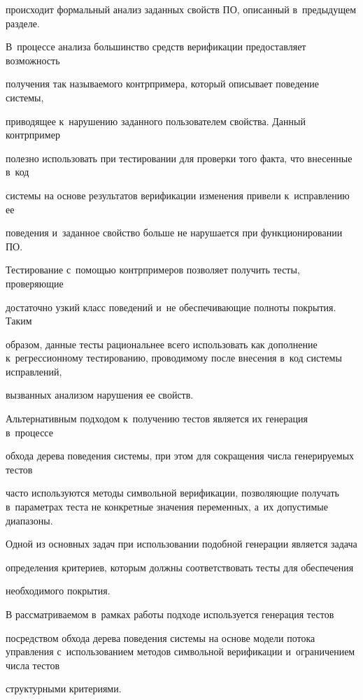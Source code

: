происходит формальный анализ заданных свойств ПО, описанный в~предыдущем разделе.


В~процессе анализа большинство средств верификации предоставляет возможность


получения так называемого контрпримера, который описывает поведение системы,


приводящее к~нарушению заданного пользователем свойства. Данный контрпример


полезно использовать при тестировании для проверки того факта, что внесенные в~код


системы на основе результатов верификации изменения привели к~исправлению ее


поведения и~заданное свойство больше не нарушается при функционировании ПО.


Тестирование с~помощью контрпримеров позволяет получить тесты, про\-ве\-ря\-ющие


достаточно узкий класс поведений и~не обеспечивающие полноты покрытия. Таким


образом, данные тесты рациональнее всего использовать как дополнение к~регрессионному тестированию, проводимому после внесения в~код системы исправлений,


вызванных анализом нарушения ее свойств.





   Альтернативным подходом к~получению тестов является их генерация в~процессе


обхода дерева поведения системы, при этом для сокращения числа генерируемых тестов


часто используются методы символьной верификации, позволяющие получать в~параметрах теста не конкретные значения переменных, а~их допустимые диапазоны.


Одной из основных задач при использовании подобной генерации является задача


определения критериев, которым должны соответствовать тесты для обеспечения


необходимого покрытия.





   В рассматриваемом в~рамках работы подходе используется генерация тестов


посредством обхода дерева поведения системы на основе модели потока управления с~использованием методов символьной верификации и~ограничением числа тестов


структурными критериями.






